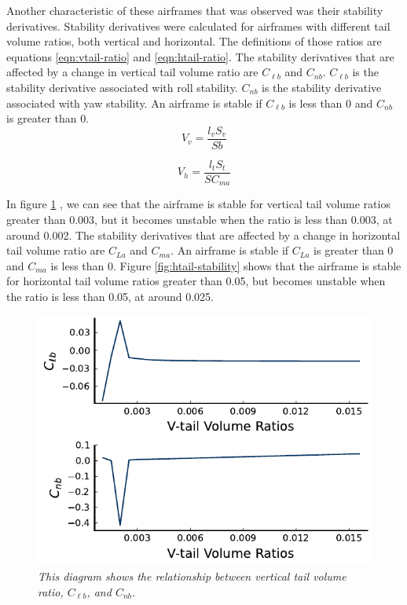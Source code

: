 \documentclass{journal}
\begin{document}
	Another characteristic of these airframes that was observed was their stability derivatives. Stability derivatives were calculated for airframes with different tail volume ratios, both vertical and horizontal. The definitions of those ratios are equations \ref{eqn:vtail-ratio} and \ref{eqn:htail-ratio}. The stability derivatives that are affected by a change in vertical tail volume ratio are \(C_{\ell{b}}\) and \(C_{nb}\). \(C_{\ell{b}}\) is the stability derivative associated with roll stability. \(C_{nb}\) is the stability derivative associated with yaw stability. An airframe is stable if \(C_{\ell{b}}\) is less than 0 and \(C_{nb}\) is greater than 0. \\
	
	\begin{equation}
		V_v = \frac{l_vS_v}{Sb}
		\label{eqn:vtail-ratio}
	\end{equation}
	
	\begin{equation}
		V_h = \frac{l_tS_t}{SC_{ma}}
		\label{eqn:htail-ratio}
	\end{equation}

	In figure \ref{fig:vtail-stability} , we can see that the airframe is stable for vertical tail volume ratios greater than 0.003, but it becomes unstable when the ratio is less than 0.003, at around 0.002. The stability derivatives that are affected by a change in horizontal tail volume ratio are \(C_{La}\) and \(C_{ma}\). An airframe is stable if \(C_{La}\) is greater than 0 and \(C_{ma}\) is less than 0. Figure \ref{fig:htail-stability} shows that the airframe is stable for horizontal tail volume ratios greater than 0.05, but becomes unstable when the ratio is less than 0.05, at around 0.025. \\
	
	\begin{figure}[H]
		\centering
		\includegraphics[scale=0.73]{../graphics/vtail-stability.pdf}
		\caption{\emph{This diagram shows the relationship between vertical tail volume ratio, \(C_{\ell{b}}\), and \(C_{nb}\).}}
		\label{fig:vtail-stability}
	\end{figure}
\end{document}
